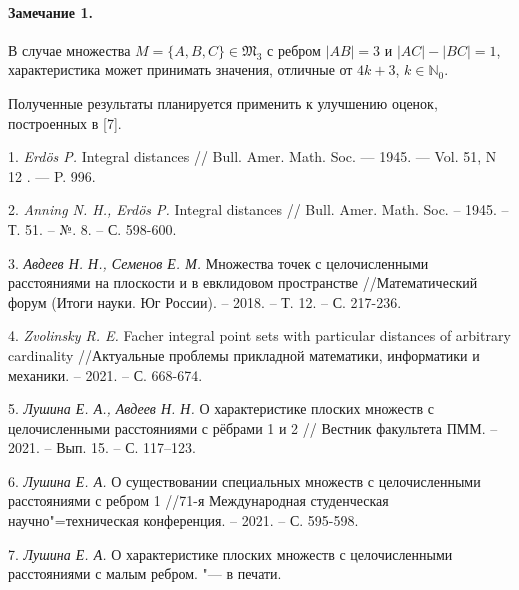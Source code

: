 \paragraph{Замечание 1.}
В случае множества $M=\{A, B, C\} \in \mathfrak{M}_{3}$ с ребром $|AB|=3$ и $|AC|-|BC|=1$, характеристика может принимать значения, отличные от $4k+3$, $k\in\mathbb{N}_{0}$.

Полученные результаты планируется применить к улучшению оценок, построенных в [7].

\litlist

1. {\it Erdös P.}
Integral distances // Bull. Amer. Math. Soc. — 1945. — Vol. 51, N 12 . — P. 996.

2. {\it Anning N. H., Erdös P. }
Integral distances // Bull. Amer. Math. Soc. – 1945. – Т. 51. – №. 8. – С. 598-600.

3. {\it Авдеев Н. Н., Семенов Е. М.}
Множества точек с целочисленными расстояниями на плоскости и в евклидовом пространстве //Математический форум (Итоги науки. Юг России). – 2018. – Т. 12. – С. 217-236.

4. \foreignlanguage{english}{{\it Zvolinsky R. E.}
Facher integral point sets with particular distances of arbitrary cardinality} //Актуальные проблемы прикладной математики, информатики и механики. – 2021. – С. 668-674.

5. {\it Лушина Е. А., Авдеев Н. Н.}
О характеристике плоских множеств с целочисленными
расстояниями с рёбрами 1 и 2 // Вестник факультета ПММ. – 2021. – Вып. 15. – С.
117–123.

6. {\it Лушина Е. А.}
О существовании специальных множеств с целочисленными расстояниями с ребром 1 //71-я Международная студенческая научно"=техническая конференция. – 2021. – С. 595-598.

7. {\it Лушина Е. А.}
О характеристике плоских множеств с целочисленными расстояниями с малым ребром. "--- в печати.
